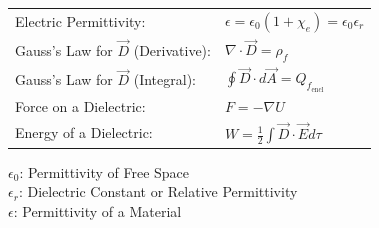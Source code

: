 \documentclass{article}
\newcommand{\formbox}[2]{\begin{center} \begin{tcolorbox}[title = #1, boxrule=2pt,arc=3.4pt,boxsep=0mm] #2\end{tcolorbox}\end{center}}
\begin{document}
\begin{multicols*}{2}
{{\begin{tabular}{ m{12em} m{25em}  }
            Electric Permittivity: & $\displaystyle \epsilon = \epsilon_0 (1 + \chi_e) = \epsilon_0 \epsilon_r$\\
            Gauss's Law for $\vec{D}$ (Derivative): & $\displaystyle \nabla \cdot \vec{D} = \rho_f$\\
            Gauss's Law for $\vec{D}$ (Integral): & $\displaystyle \oint\vec{D} \cdot d\vec{A} = Q_{f_\textrm{encl}}$\\
            Force on a Dielectric: & $F = -\nabla U$\\
            Energy of a Dielectric: & $W = \frac{1}{2}\int \vec{D} \cdot \vec{E} d\tau$
        \end{tabular}}
    }
    \formbox{Names of Stuff}{
        $\epsilon_0$: Permittivity of Free Space\\
        $\epsilon_r$: Dielectric Constant or Relative Permittivity\\
        $\epsilon$: Permittivity of a Material
    }


\end{multicols*}
\end{document}
